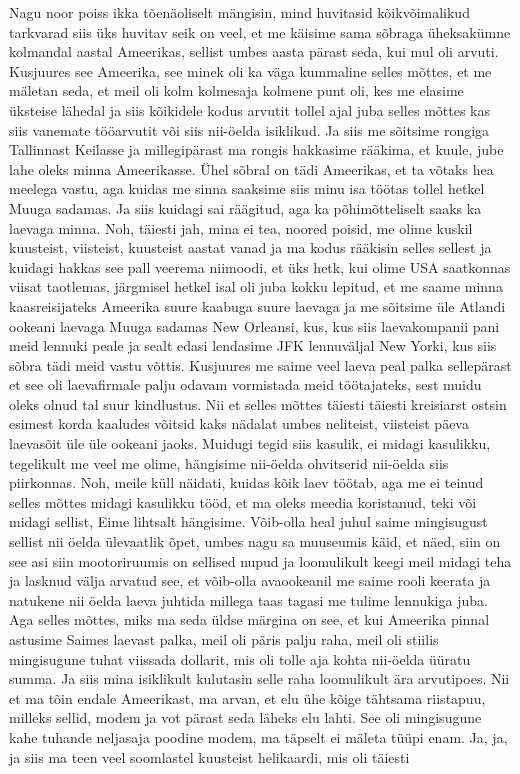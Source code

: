 Nagu noor poiss ikka tõenäoliselt mängisin, mind huvitasid kõikvõimalikud tarkvarad siis üks huvitav seik on veel, et me käisime sama sõbraga üheksakümne kolmandal aastal Ameerikas, sellist umbes aasta pärast seda, kui mul oli arvuti. Kusjuures see Ameerika, see minek oli ka väga kummaline selles mõttes, et me mäletan seda, et meil oli kolm kolmesaja kolmene punt oli, kes me elasime üksteise lähedal ja siis kõikidele kodus arvutit tollel ajal juba selles mõttes kas siis vanemate tööarvutit või siis nii-öelda isiklikud. Ja siis me sõitsime rongiga Tallinnast Keilasse ja millegipärast ma rongis hakkasime rääkima, et kuule, jube lahe oleks minna Ameerikasse. Ühel sõbral on tädi Ameerikas, et ta võtaks hea meelega vastu, aga kuidas me sinna saaksime siis minu isa töötas tollel hetkel Muuga sadamas. Ja siis kuidagi sai räägitud, aga ka põhimõtteliselt saaks ka laevaga minna. Noh, täiesti jah, mina ei tea, noored poisid, me olime kuskil kuusteist, viisteist, kuusteist aastat vanad ja ma kodus rääkisin selles sellest ja kuidagi hakkas see pall veerema niimoodi, et üks hetk, kui olime USA saatkonnas viisat taotlemas, järgmisel hetkel isal oli juba kokku lepitud, et me saame minna kaasreisijateks Ameerika suure kaabuga suure laevaga ja me sõitsime üle Atlandi ookeani laevaga Muuga sadamas New Orleansi, kus, kus siis laevakompanii pani meid lennuki peale ja sealt edasi lendasime JFK lennuväljal New Yorki, kus siis sõbra tädi meid vastu võttis. Kusjuures me saime veel laeva peal palka sellepärast et see oli laevafirmale palju odavam vormistada meid töötajateks, sest muidu oleks olnud tal suur kindlustus. Nii et selles mõttes täiesti täiesti kreisiarst ostsin esimest korda kaaludes võitsid kaks nädalat umbes neliteist, viisteist päeva laevasõit üle üle ookeani jaoks. Muidugi tegid siis kasulik, ei midagi kasulikku, tegelikult me veel me olime, hängisime nii-öelda ohvitserid nii-öelda siis piirkonnas. Noh, meile küll näidati, kuidas kõik laev töötab, aga me ei teinud selles mõttes midagi kasulikku tööd, et ma oleks meedia koristanud, teki või midagi sellist, Eime lihtsalt hängisime. Võib-olla heal juhul saime mingisugust sellist nii öelda ülevaatlik õpet, umbes nagu sa muuseumis käid, et näed, siin on see asi siin mootoriruumis on sellised nupud ja loomulikult keegi meil midagi teha ja lasknud välja arvatud see, et võib-olla avaookeanil me saime rooli keerata ja natukene nii öelda laeva juhtida millega taas tagasi me tulime lennukiga juba. Aga selles mõttes, miks ma seda üldse märgina on see, et kui Ameerika pinnal astusime Saimes laevast palka, meil oli päris palju raha, meil oli stiilis mingisugune tuhat viissada dollarit, mis oli tolle aja kohta nii-öelda üüratu summa. Ja siis mina isiklikult kulutasin selle raha loomulikult ära arvutipoes. Nii et ma tõin endale Ameerikast, ma arvan, et elu ühe kõige tähtsama riistapuu, milleks sellid, modem ja vot pärast seda läheks elu lahti. See oli mingisugune kahe tuhande neljasaja poodine modem, ma täpselt ei mäleta tüüpi enam. Ja, ja, ja siis ma teen veel soomlastel kuusteist helikaardi, mis oli täiesti
